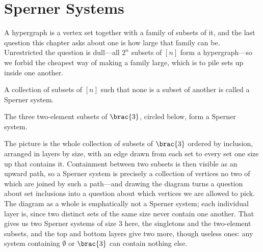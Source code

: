 \section{Sperner Systems}

A hypergraph is a vertex set together with a family of subsets of it, and the last question this chapter asks about one is how large that family can be. Unrestricted the question is dull---all $2^n$ subsets of $[n]$ form a hypergraph---so we forbid the cheapest way of making a family large, which is to pile sets up inside one another.

\begin{boxdefinition}
    A collection of subsets of $[n]$ such that none is a subset of another is called a Sperner system.
\end{boxdefinition}

\begin{boxexample}
    The three two-element subsets of $\brac{3}$, circled below, form a Sperner system.
\end{boxexample}

\begin{figure}[H]
    \centering
\end{figure}

The picture is the whole collection of subsets of $\brac{3}$ ordered by inclusion, arranged in layers by size, with an edge drawn from each set to every set one size up that contains it. Containment between two subsets is then visible as an upward path, so a Sperner system is precisely a collection of vertices no two of which are joined by such a path---and drawing the diagram turns a question about set inclusions into a question about which vertices we are allowed to pick. The diagram as a whole is emphatically not a Sperner system; each individual layer is, since two distinct sets of the same size never contain one another. That gives us two Sperner systems of size $3$ here, the singletons and the two-element subsets, and the top and bottom layers give two more, though useless ones: any system containing $\emptyset$ or $\brac{3}$ can contain nothing else.

